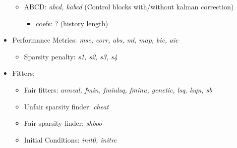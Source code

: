 \documentclass[11pt]{article}
\begin{document}
\begin{itemize}
\begin{itemize}
\item ABCD: \emph{abcd, kabcd} (Control blocks with/without kalman correction)

\begin{itemize}
\item coefs: ? (history length)
\end{itemize}

\end{itemize}

\item Performance Metrics: \emph{mse, corr, abs, ml, map, bic, aic}

\begin{itemize}
\item Sparsity penalty: \emph{s1, s2, s3, s4}
\end{itemize}

\item Fitters:

\begin{itemize}
\item Fair fitters: \emph{anneal, fmin, fminlsq, fminu, genetic, lsq, lsqn, sb}
\item Unfair sparsity finder: \emph{cheat}
\item Fair sparsity finder: \emph{shboo}
\item Initial Conditions: \emph{init0, initrc}
\end{itemize}

\end{itemize}
\end{document}
